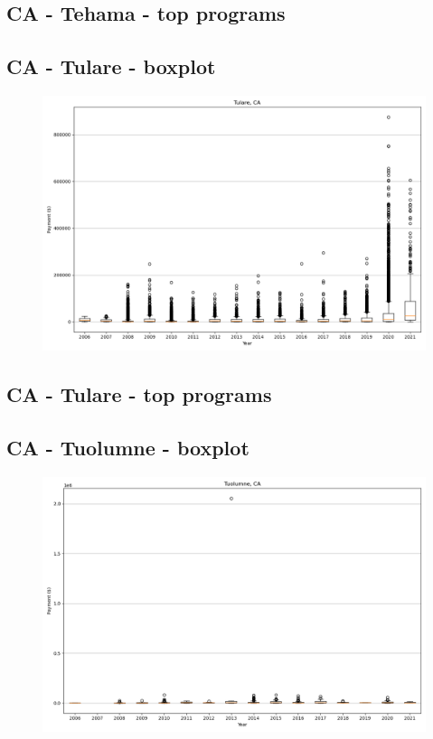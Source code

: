 \subsection*{CA - Tehama - top programs}

\newpage
\subsection*{CA - Tulare - boxplot}
\begin{figure}[h]
\centering
\includegraphics[width=7in]{../output/boxplots/counties/Tulare-CA_boxplot.png}
\end{figure}


\subsection*{CA - Tulare - top programs}

\newpage
\subsection*{CA - Tuolumne - boxplot}
\begin{figure}[h]
\centering
\includegraphics[width=7in]{../output/boxplots/counties/Tuolumne-CA_boxplot.png}
\end{figure}


